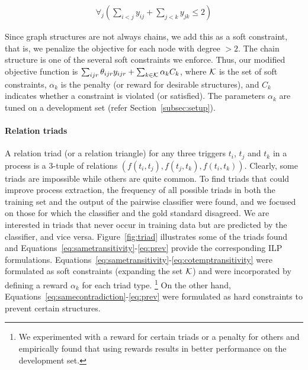 \begin{align}
\forall_j (\sum_{i<j} y_{ij} + \sum_{j<k} y_{jk} \leq 2)
\end{align}

Since graph structures are not always chains, we add this as a soft constraint, that is, we penalize the objective for each node with degree $>2$. The chain structure is one of the several soft constraints we enforce. Thus, our modified objective function is $\sum_{ijr} \theta_{ijr} y_{ijr} + \sum_{k \in \mathcal{K}} \alpha_k C_k$, where $\mathcal{K}$ is the set of soft constraints, $\alpha_k$ is the penalty (or reward for desirable structures), and $C_k$ indicates whether a constraint is violated (or satisfied). The parameters $\alpha_k$ are tuned on a development set (refer Section~\ref{subsec:setup}).

\paragraph{Relation triads} 
A relation triad (or a relation triangle) for any three triggers $t_{i}$, $t_{j}$ and $t_{k}$ in a process is a 3-tuple of relations $(f(t_i, t_j),f(t_j, t_k),f(t_i, t_k))$. Clearly, some triads are impossible while others are quite common. To find triads that could improve process extraction, the frequency of all possible triads in both the training set and the output of the pairwise classifier were found, and we focused on those for which the classifier and the gold standard disagreed. We are interested in triads that never occur in training data but are predicted by the classifier, and vice versa. Figure~\ref{fig:triad} illustrates some of the triads found and Equations~\ref{eq:sametransitivity}-\ref{eq:prev} provide the corresponding ILP formulations. Equations~\ref{eq:sametransitivity}-\ref{eq:cotemptransitivity} were formulated as soft constraints (expanding the set $\mathcal{K}$) and were incorporated by defining a reward $\alpha_k$ for each triad type. \footnote{We experimented with a reward for certain triads or a penalty for others and empirically found that using rewards results in better performance on the development set.} On the other hand, Equations~\ref{eq:samecontradiction}-\ref{eq:prev} were formulated as hard constraints to prevent certain structures.


